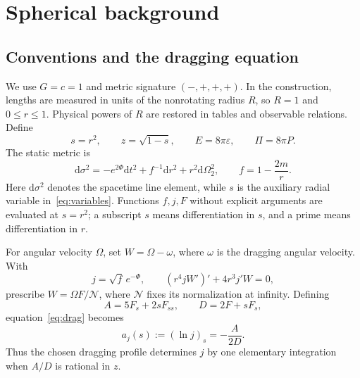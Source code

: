 \documentclass[journal,a4paper]{IEEEtran}
\newcommand{\dd}{\mathrm d}
\begin{document}
\section{Spherical background}
\subsection{Conventions and the dragging equation}
We use $G=c=1$ and metric signature $(-,+,+,+)$. In the construction, lengths are measured in units of the nonrotating radius $R$, so $R=1$ and $0\le r\le1$. Physical powers of $R$ are restored in tables and observable relations. Define
\begin{equation}
 s=r^2,\qquad z=\sqrt{1-s},\qquad
 E=8\pi\varepsilon,\qquad \Pi=8\pi P.
 \label{eq:variables}
\end{equation}
The static metric is
\begin{equation}
 \dd\sigma^2=-e^{2\Phi}\dd t^2+f^{-1}\dd r^2+r^2\dd\Omega_2^2,
 \qquad f=1-\frac{2m}{r}.
 \label{eq:staticmetric}
\end{equation}
Here $\dd\sigma^2$ denotes the spacetime line element, while $s$ is the auxiliary radial variable in~\eqref{eq:variables}. Functions $f,j,F$ without explicit arguments are evaluated at $s=r^2$; a subscript $s$ means differentiation in $s$, and a prime means differentiation in $r$.

For angular velocity $\Omega$, set $W=\Omega-\omega$, where $\omega$ is the dragging angular velocity. With
\begin{equation}
 j=\sqrt f\,e^{-\Phi},
 \qquad (r^4jW')'+4r^3j'W=0,
 \label{eq:drag}
\end{equation}
prescribe $W=\Omega F/\mathcal N$, where $\mathcal N$ fixes its normalization at infinity. Defining
\begin{equation}
 A=5F_s+2sF_{ss},\qquad D=2F+sF_s,
 \label{eq:AD}
\end{equation}
equation~\eqref{eq:drag} becomes
\begin{equation}
 a_j(s):=(\ln j)_s=-\frac{A}{2D}.
 \label{eq:a}
\end{equation}
Thus the chosen dragging profile determines $j$ by one elementary integration when $A/D$ is rational in $z$.
\end{document}
